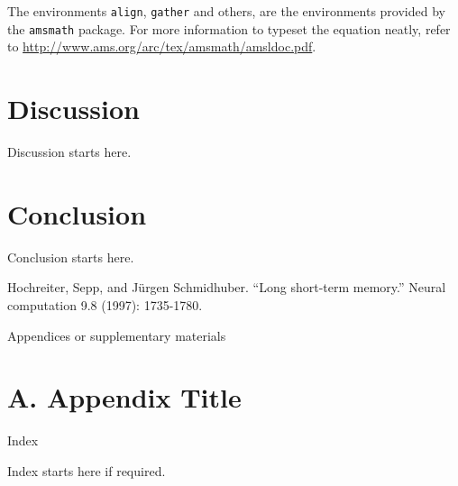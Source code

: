 \documentclass[11pt]{report}
\theoremstyle{plain}
\theoremstyle{definition}
\theoremstyle{corollary}
\theoremstyle{definition}
\theoremstyle{plain}
\theoremstyle{definition}
\theoremstyle{plain}
\begin{document}
The environments \texttt{align}, \texttt{gather} and others, are the environments provided by the \texttt{amsmath} package.
For more information to typeset the equation neatly, refer to \url{http://www.ams.org/arc/tex/amsmath/amsldoc.pdf}.

\chapter{Discussion}\label{chap:discussion}
Discussion starts here.

\chapter{Conclusion}\label{chap:conclusion}
Conclusion starts here. 


\renewcommand\bibname{Reference(or Bibliography)}
\begin{thebibliography}{AA}
 Hochreiter, Sepp, and Jürgen Schmidhuber. ``Long short-term memory.'' Neural computation 9.8 (1997): 1735-1780.
\end{thebibliography}

%
%
%
\newpage
\begin{center}
\large
Appendices or supplementary materials
\end{center}
\chapter*{A. Appendix Title}
%

\newpage
\begin{center}
\large
Index

\end{center}
\normalsize
Index starts here if required.
\end{document}
